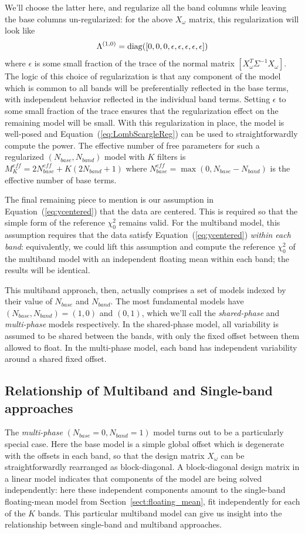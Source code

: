 \documentclass{emulateapj}
\newcommand{\Eq}[1]{Equation~(\ref{eq:#1})}
\newcommand{\eq}[1]{\Eq{#1}}
\newcommand{\Sect}[1]{Section~\ref{sect:#1}}
\newcommand{\sect}[1]{\Sect{#1}}
\newcommand{\sectlabel}[1]{\label{sect:#1}}
\begin{document}
We'll choose the latter here, and regularize all the band columns while leaving the base columns un-regularized: for the above $X_\omega$ matrix, this regularization will look like
\begin{equation}
  \Lambda^{(1,0)} = {\rm diag}([0, 0, 0, \epsilon, \epsilon, \epsilon, \epsilon, \epsilon])
\end{equation}
where $\epsilon$ is some small fraction of the trace of the normal matrix $[X_\omega^T\Sigma^{-1}X_\omega]$. The logic of this choice of regularization is that any component of the model which is common to all bands will be preferentially reflected in the base terms, with independent behavior reflected in the individual band terms. Setting $\epsilon$ to some small fraction of the trace ensures that the regularization effect on the remaining model will be small. With this regularization in place, the model is well-posed and \eq{LombScargleReg} can be used to straightforwardly compute the power. The effective number of free parameters for such a regularized $(N_{base}, N_{band})$ model with $K$ filters is
$M_K^{eff} = 2N_{base}^{eff} + K(2N_{band} + 1)$ where $N_{base}^{eff} = \max(0, N_{base} - N_{band})$ is the effective number of base terms.

The final remaining piece to mention is our assumption in \eq{ycentered} that the data are centered. This is required so that the simple form of the reference $\chi^2_0$ remains valid. For the multiband model, this assumption requires that the data satisfy \eq{ycentered} {\it within each band}: equivalently, we could lift this assumption and compute the reference $\chi^2_0$ of the multiband model with an independent floating mean within each band; the results will be identical.

This multiband approach, then, actually comprises a set of models indexed by their value of $N_{base}$ and $N_{band}$. The most fundamental models have $(N_{base}, N_{band}) = (1,0)$ and $(0,1)$, which we'll call the {\it shared-phase} and {\it multi-phase} models respectively. In the shared-phase model, all variability is assumed to be shared between the bands, with only the fixed offset between them allowed to float. In the multi-phase model, each band has independent variability around a shared fixed offset.

\subsection{Relationship of Multiband and Single-band approaches}
\sectlabel{relationship}
The {\it multi-phase} $(N_{base}=0, N_{band}=1)$ model turns out to be a particularly special case.
Here the base model is a simple global offset which is degenerate with the offsets in each band, so that the design matrix $X_\omega$ can be straightforwardly rearranged as block-diagonal.
A block-diagonal design matrix in a linear model indicates that components of the model are being solved independently: here these independent components amount to the single-band floating-mean model from \sect{floating_mean}, fit independently for each of the $K$ bands.
This particular multiband model can give us insight into the relationship between single-band and multiband approaches.
\end{document}
